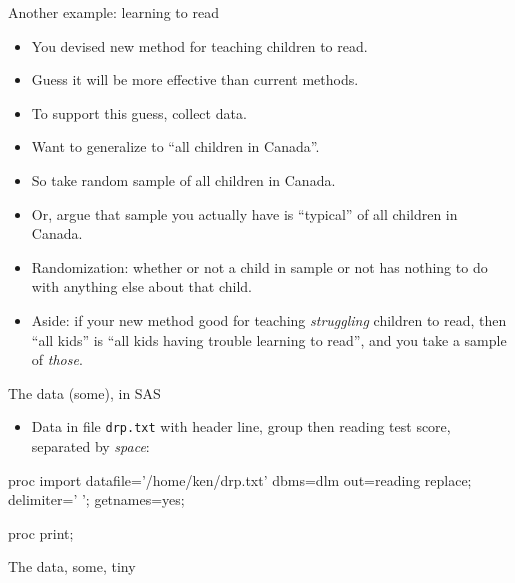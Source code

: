 \documentclass[unknownkeysallowed]{beamer}\usepackage[]{graphicx}\usepackage[]{color}
\begin{document}
\begin{frame}{Another example: learning to read}

  \begin{itemize}
  \item You devised new method for teaching children to read.
  \item Guess it will be more effective than current methods.
  \item To support this guess, collect data.
  \item Want to generalize to ``all children in Canada''.
  \item So take random sample of all children in Canada.
  \item Or, argue that sample you actually have is ``typical'' of all
    children in Canada.
  \item Randomization: whether or not a child in sample or not has
    nothing to do with anything else about that child.
  \item Aside: if your new method good for 
    teaching \emph{struggling} children to read, then ``all
    kids'' is ``all kids having trouble learning to
    read'', and you take a sample of \emph{those}.
  \end{itemize}
  
\end{frame}

\begin{frame}[fragile]{The data (some), in SAS}

  \begin{itemize}
    \item Data in file \texttt{drp.txt} with header line, group then
    reading test score, separated by \emph{space}:
  \end{itemize}

\begin{Datastep}
proc import
  datafile='/home/ken/drp.txt'
  dbms=dlm
  out=reading
  replace;
  delimiter=' ';
  getnames=yes;
\end{Datastep}
\begin{Sascode}[store=ix]
  proc print;
\end{Sascode}
  
\end{frame}


\begin{frame}[fragile]{The data, some, tiny}

  
\end{frame}
\end{document}
